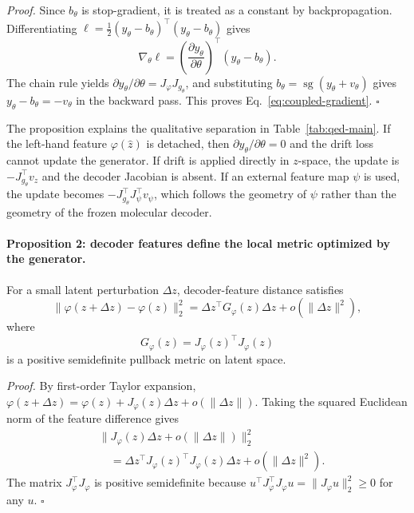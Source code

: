 \documentclass[letterpaper]{article}
\begin{document}
\emph{Proof.}
Since $b_\theta$ is stop-gradient, it is treated as a constant by
backpropagation.  Differentiating
$\ell=\frac{1}{2}(y_\theta-b_\theta)^\top(y_\theta-b_\theta)$ gives
\begin{equation}
    \nabla_\theta \ell
    =
    \left(\frac{\partial y_\theta}{\partial\theta}\right)^\top
    (y_\theta-b_\theta).
\end{equation}
The chain rule yields
$\partial y_\theta/\partial\theta=J_\varphi J_{g_\theta}$, and substituting
$b_\theta=\operatorname{sg}(y_\theta+v_\theta)$ gives
$y_\theta-b_\theta=-v_\theta$ in the backward pass. This proves
Eq.~\eqref{eq:coupled-gradient}. \hfill $\square$

The proposition explains the qualitative separation in Table~\ref{tab:qed-main}.
If the left-hand feature $\varphi(\hat z)$ is detached, then
$\partial y_\theta/\partial\theta=0$ and the drift loss cannot update the
generator.  If drift is applied directly in $z$-space, the update is
$-J_{g_\theta}^{\top}v_z$ and the decoder Jacobian is absent.  If an external
feature map $\psi$ is used, the update becomes
$-J_{g_\theta}^{\top}J_\psi^\top v_\psi$, which follows the geometry of
$\psi$ rather than the geometry of the frozen molecular decoder.

\paragraph{Proposition 2: decoder features define the local metric optimized by
the generator.}
For a small latent perturbation $\Delta z$, decoder-feature distance satisfies
\begin{equation}
    \|\varphi(z+\Delta z)-\varphi(z)\|_2^2
    =
    \Delta z^\top G_\varphi(z)\Delta z
    + o(\|\Delta z\|^2),
    \label{eq:pullback}
\end{equation}
where
\begin{equation}
    G_\varphi(z)=J_\varphi(z)^\top J_\varphi(z)
\end{equation}
is a positive semidefinite pullback metric on latent space.

\emph{Proof.}
By first-order Taylor expansion,
$\varphi(z+\Delta z)=\varphi(z)+J_\varphi(z)\Delta z+o(\|\Delta z\|)$.
Taking the squared Euclidean norm of the feature difference gives
\begin{align}
&\|J_\varphi(z)\Delta z+o(\|\Delta z\|)\|_2^2 \nonumber\\
&\quad =
\Delta z^\top J_\varphi(z)^\top J_\varphi(z)\Delta z
+ o(\|\Delta z\|^2).
\end{align}
The matrix $J_\varphi^\top J_\varphi$ is positive semidefinite because
$u^\top J_\varphi^\top J_\varphi u=\|J_\varphi u\|_2^2\ge0$ for any $u$.
\hfill $\square$
\end{document}
